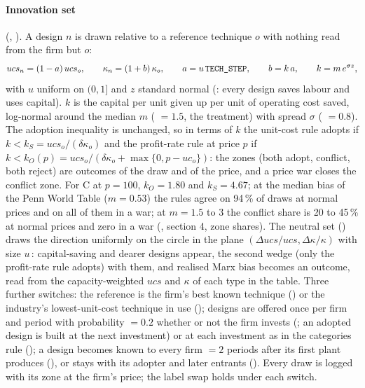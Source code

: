 \paragraph{Innovation set} (,
). A design $n$ is drawn relative to a reference
technique $o$ with nothing read from the firm but $o$:
\[
ucs_n = (1-a)\,ucs_o, \qquad \kappa_n = (1+b)\,\kappa_o, \qquad
a = u\,\text{\texttt{TECH\_STEP}}, \qquad b = k\,a, \qquad k = m\,e^{\sigma z},
\]
with $u$ uniform on $(0, 1]$ and $z$ standard normal (: every
design saves labour and uses capital). $k$ is the capital per unit given up per unit of
operating cost saved, log-normal around the median $m$ ( $= 1.5$, the
treatment) with spread $\sigma$ ( $= 0.8$). The adoption
inequality is unchanged, so in terms of $k$ the unit-cost rule adopts if
$k < k_S = ucs_o/(\delta\kappa_o)$ and the profit-rate rule at price $p$ if
$k < k_O(p) = ucs_o/(\delta\kappa_o + \max\{0, p - uc_o\})$: the zones (both adopt,
conflict, both reject) are outcomes of the draw and of the price, and a price war closes
the conflict zone. For C at $p = 100$, $k_O = 1.80$ and $k_S = 4.67$; at the median bias of
the Penn World Table ($m = 0.53$) the rules agree on 94\,\% of draws at normal prices and
on all of them in a war; at $m = 1.5$ to $3$ the conflict share is 20 to 45\,\% at normal
prices and zero in a war (, section 4, zone shares). The
neutral set () draws the direction uniformly on the circle in
the plane $(\Delta ucs/ucs, \Delta\kappa/\kappa)$ with size $u\,$:
capital-saving and dearer designs appear, the second wedge (only the profit-rate rule
adopts) with them, and realised Marx bias becomes an outcome, read from the
capacity-weighted $ucs$ and $\kappa$ of each type in the  table. Three further
switches: the reference is the firm's best known technique ()
or the industry's lowest-unit-cost technique in use (); designs are
offered once per firm and period with probability  $= 0.2$ whether
or not the firm invests (; an adopted design is built at
the next investment) or at each investment as in the categories rule
(); a design becomes known to every firm  $= 2$
periods after its first plant produces (), or stays with
its adopter and later entrants (). Every draw is logged with its zone at
the firm's price; the label swap holds under each switch.

